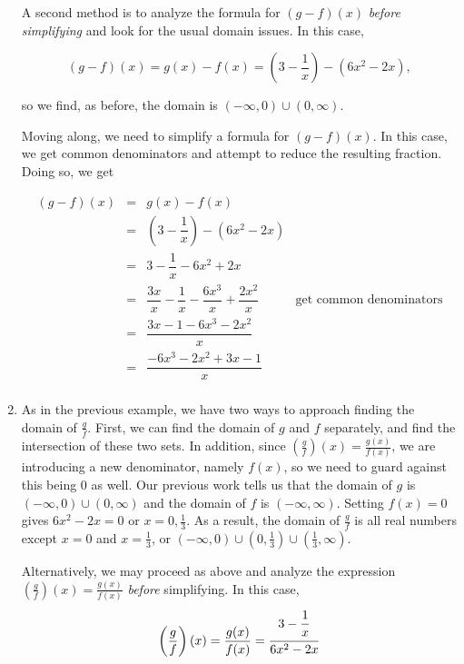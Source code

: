 \begin{ex}
\begin{enumerate}
A second method is to analyze the formula for $(g-f)(x)$ \textit{before simplifying} and look for the usual domain issues.  In this case, 

\[ (g-f)(x) = g(x) - f(x) = \left(3-\dfrac{1}{x}\right) - \left(6x^2 - 2x\right),\]

so we find, as before, the domain is $(-\infty, 0) \cup (0, \infty)$.

Moving along, we need to simplify a formula for $(g-f)(x)$.  In this case, we get common denominators and attempt to reduce the resulting fraction.  Doing so, we get

\[ \begin{array}{rclr}
(g-f)(x) & = & g(x) - f(x) & \\ [5pt]
         & = & \left(3-\dfrac{1}{x}\right) - \left(6x^2 - 2x\right) &\\  [10pt]
         & = & 3 - \dfrac{1}{x} - 6x^2 + 2x & \\  [10pt]
         & = & \dfrac{3x}{x} - \dfrac{1}{x} - \dfrac{6x^3}{x} + \dfrac{2x^2}{x} & \text{get common denominators} \\  [10pt]
         & = & \dfrac{3x - 1 - 6x^3 - 2x^2}{x} & \\  [10pt]
         & = & \dfrac{-6x^3-2x^2+3x-1}{x} & \\   
\end{array}\]         

\item  As in the previous example, we have two ways to approach finding the domain of $\frac{g}{f}$.  First, we can find the domain of $g$ and $f$ separately, and find the intersection of these two sets.  In addition, since $\left(\frac{g}{f}\right)(x) = \frac{g(x)}{f(x)}$, we are introducing a new denominator, namely $f(x)$, so we need to guard against this being $0$ as well.  Our previous work tells us that the domain of $g$ is $(-\infty, 0) \cup (0, \infty)$ and the domain of $f$ is $(-\infty, \infty)$.  Setting $f(x) = 0$ gives $6x^2 - 2x = 0$ or $x = 0, \frac{1}{3}$.  As a result, the domain of $\frac{g}{f}$ is all real numbers except $x = 0$ and $x = \frac{1}{3}$, or $(-\infty, 0) \cup \left(0, \frac{1}{3} \right) \cup \left( \frac{1}{3}, \infty \right)$.

Alternatively, we may proceed as above and analyze the expression $\left(\frac{g}{f}\right)(x) = \frac{g(x)}{f(x)}$ \textit{before} simplifying.  In this case, \[ \left(\dfrac{g}{f}\right)(x) = \dfrac{g(x)}{f(x)}  = \dfrac{3-\dfrac{1}{x}\vphantom{\left(\dfrac{1}{x}\right)}}{6x^2 - 2x}\]


\end{enumerate}
\end{ex}
